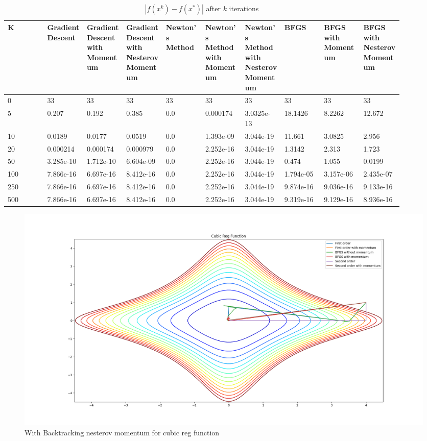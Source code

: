 \documentclass{article}
\begin{document}
\begin{table}[H]
	\centering
	\caption{$ | f(x^k) - f(x^*) | $ after $k$ iterations}
	\label{Cubic Reg function table}
	\begin{tabular}{|l|p{0.1\linewidth}|p{0.1\linewidth}|p{0.1\linewidth}|p{0.1\linewidth}|p{0.1\linewidth}|p{0.1\linewidth}|p{0.1\linewidth}|p{0.1\linewidth}|p{0.1\linewidth}|}
		\hline
		K & Gradient Descent & Gradient Descent with Momentum & Gradient Descent with Nesterov Momentum & Newton's Method & Newton's Method with Momentum & Newton's Method with Nesterov Momentum & BFGS & BFGS with Momentum & BFGS with Nesterov Momentum \\
		\hline
		0 & 33 & 33 & 33 & 33 & 33 & 33 & 33 & 33 & 33 \\
		\hline
		5 & 0.207 & 0.192 & 0.385 & 0.0 & 0.000174 & 3.0325e-13 & 18.1426 & 8.2262 & 12.672 \\
		\hline
		10 & 0.0189 & 0.0177 & 0.0519 & 0.0 & 1.393e-09 & 3.044e-19 & 11.661 & 3.0825 & 2.956 \\
		\hline
		20 & 0.000214 & 0.000174 & 0.000979 & 0.0 & 2.252e-16 & 3.044e-19 & 1.3142 & 2.313 & 1.723 \\
		\hline
		50 & 3.285e-10 & 1.712e-10 & 6.604e-09 & 0.0 & 2.252e-16 & 3.044e-19 & 0.474 & 1.055 & 0.0199 \\
		\hline
		100 & 7.866e-16 & 6.697e-16 & 8.412e-16 & 0.0 & 2.252e-16 & 3.044e-19 & 1.794e-05 & 3.157e-06 & 2.435e-07 \\
		\hline
		250 & 7.866e-16 & 6.697e-16 & 8.412e-16 & 0.0 & 2.252e-16 & 3.044e-19 & 9.874e-16 & 9.036e-16 & 9.133e-16 \\
		\hline
		500 & 7.866e-16 & 6.697e-16 & 8.412e-16 & 0.0 & 2.252e-16 & 3.044e-19 & 9.319e-16 & 9.129e-16 & 8.936e-16 \\
		\hline
	\end{tabular}
\end{table}

\begin{figure}[H]
	\includegraphics[width=\linewidth]{../Images/cubicregbacktrack.png}
	\caption{With Backtracking nesterov momentum for cubic reg function}
	\label{fig:With Backtracking nesterov momentum for cubic reg function}
\end{figure}
\end{document}

